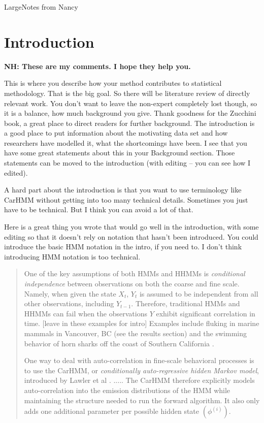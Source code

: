 \documentclass[12pt]{TD-CJS}
\begin{document}

\vfill\eject
{\centerline{Large{Notes from Nancy}}}

\vfill\eject

%
\section{Introduction}

{\bf{NH: These are my comments.  I hope they help you.}}

This is where you describe how your method contributes to statistical methodology. That is the big goal.  So there will be literature review of directly relevant work.  You don't want to leave the non-expert completely lost though, so it is a balance, how much background you give.
Thank goodness for the Zucchini book, a great place to direct readers for further background.  
The introduction is a good place to put information about the motivating data set and how researchers have modelled it, what the shortcomings have been.  I see that you have some great statements about this in your Background section.  Those statements can be moved to the introduction (with editing -- you can see how I edited).

A hard part about the introduction is that you want to use terminology like CarHMM without getting into too many technical details.  Sometimes you just have to be technical.  But I think you can avoid a lot of that.

Here is a great thing you wrote that would go well in the introduction, with some editing so that it doesn't rely on notation that hasn't been introduced. You could introduce the basic HMM notation in the intro, if you need to.  I don't think introducing HMM notation is too technical.
\begin{quote}
 One of the key assumptions of both HMMs and HHMMs is \textit{conditional independence} between observations on both the coarse and fine scale. Namely, when given the state $X_t$, $Y_t$ is assumed to be independent from all other observations, including $Y_{t-1}$. Therefore, traditional HMMs and HHMMs can fail when the observations $Y$ exhibit significant correlation in time.
 [leave in these examples for intro]  Examples include fluking in marine mammals in Vancouver, BC (see the results section) and the swimming behavior of horn sharks off the coast of Southern California \cite{Adam:2019}.

One way to deal with auto-correlation in fine-scale behavioral processes is to use the CarHMM, or \textit{conditionally auto-regressive hidden Markov model}, introduced by Lawler et al \cite{Lawler:2019}. .....
The CarHMM therefore explicitly models auto-correlation into the emission distributions of the HMM while maintaining the structure needed to run the forward algorithm. It also only adds one additional parameter per possible hidden state $(\phi^{(i)})$. 
\end{quote}
\end{document}
